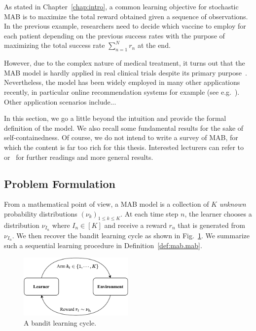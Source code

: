 As stated in Chapter~\ref{chap:intro}, a common learning objective for stochastic MAB is to maximize the total reward obtained given a sequence of observations. In the previous example, researchers need to decide which vaccine to employ for each patient depending on the previous success rates with the purpose of maximizing the total success rate $\sum_{n=1}^N r_n$ at the end.

However, due to the complex nature of medical treatment, it turns out that the MAB model is hardly applied in real clinical trials despite its primary purpose~\citep{reda2020drug}. Nevertheless, the model has been widely employed in many other applications recently, in particular online recommendation systems for example (see e.g.~\citealt{li2010contextual,zeng2016online}). Other application scenarios include...

In this section, we go a little beyond the intuition and provide the formal definition of the model. We also recall some fundamental results for the sake of self-containedness. Of course, we do not intend to write a survey of MAB, for which the content is far too rich for this thesis. Interested lecturers can refer to~\cite{bubeck2012bandits,lattimore2018bandits} or~\cite{slivkins2019bandits} for further readings and more general results.

\subsection{Problem Formulation}\label{sec:mab.model.formulation}

From a mathematical point of view, a MAB model is a collection of $K$ \emph{unknown} probability distributions $(\nu_k)_{1 \leq k \leq K}$. At each time step $n$, the learner chooses a distribution $\nu_{I_n}$ where $I_n\in[K]$ and receive a reward $r_n$ that is generated from $\nu_{I_n}$. We then recover the bandit learning cycle as shown in Fig.~\ref{fig:mab.mab}. We summarize such a sequential learning procedure in Definition~\ref{def:mab.mab}.

\begin{figure}[ht]
    \centering
    \includegraphics[width=0.5\textwidth]{Chapter2/img/mab_bis.pdf}
    \caption{A bandit learning cycle.}
    \label{fig:mab.mab}
\end{figure}

